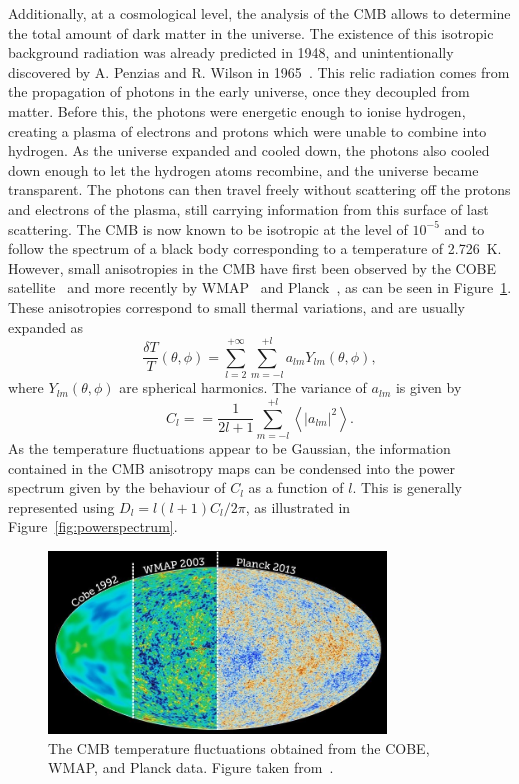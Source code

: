 Additionally, at a cosmological level, the analysis of the \ac{CMB} allows to determine the total amount of dark matter in the universe. The existence of this isotropic background radiation was already predicted in 1948, and unintentionally discovered by A. Penzias and R. Wilson in 1965~\cite{Penzias:1965wn}. This relic radiation comes from the propagation of photons in the early universe, once they decoupled from matter. Before this, the photons were energetic enough to ionise hydrogen, creating a plasma of electrons and protons which were unable to combine into hydrogen. As the universe expanded and cooled down, the photons also cooled down enough to let the hydrogen atoms recombine, and the universe became transparent. The photons can then travel freely without scattering off the protons and electrons of the plasma, still carrying information from this surface of last scattering. The \ac{CMB} is now known to be isotropic at the level of $10^{-5}$ and to follow the spectrum of a black body corresponding to a temperature of 2.726~K. However, small anisotropies in the \ac{CMB} have first been observed by the COBE satellite~\cite{Smoot:1992td} and more recently by WMAP~\cite{Komatsu:2010fb} and Planck~\cite{Ade:2013zuv}, as can be seen in Figure~\ref{fig:CMB}. These anisotropies correspond to small thermal variations, and are usually expanded as
\begin{equation}
 \frac{\delta T}{T}(\theta, \phi) = \sum_{l=2}^{+\infty}\sum_{m=-l}^{+l} a_{lm} Y_{lm}(\theta, \phi), 
\end{equation}
where $Y_{lm}(\theta, \phi)$ are spherical harmonics. %
The variance of $a_{lm}$ is given by
\begin{equation}
 C_l =  = \frac{1}{2l+1}\sum_{m=-l}^{+l} 
\left\langle|a_{lm}|^2\right\rangle.
\end{equation}
As the temperature fluctuations appear to be Gaussian, the information contained in the \ac{CMB} anisotropy maps can be condensed into the power spectrum given by the behaviour of $C_l$ as a function of $l$. This is generally represented using $D_l = l(l+1)C_l/2\pi$, as illustrated in Figure~\ref{fig:powerspectrum}.

\begin{figure}[ht]
  \centering
  \includegraphics[width=0.8\textwidth]{cmb1.jpg}\hfill%
  \caption{The \ac{CMB} temperature fluctuations obtained from the COBE, WMAP, and Planck data. Figure taken from~\cite{CMB}.}
  \label{fig:CMB}
\end{figure}

